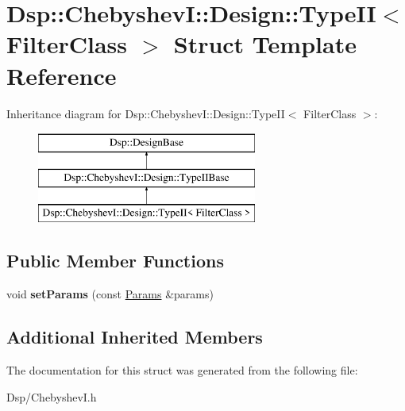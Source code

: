 \hypertarget{structDsp_1_1ChebyshevI_1_1Design_1_1TypeII}{\section{Dsp\-:\-:Chebyshev\-I\-:\-:Design\-:\-:Type\-I\-I$<$ Filter\-Class $>$ Struct Template Reference}
\label{structDsp_1_1ChebyshevI_1_1Design_1_1TypeII}
}
Inheritance diagram for Dsp\-:\-:Chebyshev\-I\-:\-:Design\-:\-:Type\-I\-I$<$ Filter\-Class $>$\-:\begin{figure}[H]
\begin{center}
\leavevmode
\includegraphics[height=3.000000cm]{structDsp_1_1ChebyshevI_1_1Design_1_1TypeII}
\end{center}
\end{figure}
\subsection*{Public Member Functions}
\begin{DoxyCompactItemize}
\item 
\hypertarget{structDsp_1_1ChebyshevI_1_1Design_1_1TypeII_acf75b338d501f75ad675232537eddf24}{void {\bfseries set\-Params} (const \hyperlink{structDsp_1_1Params}{Params} \&params)}\label{structDsp_1_1ChebyshevI_1_1Design_1_1TypeII_acf75b338d501f75ad675232537eddf24}

\end{DoxyCompactItemize}
\subsection*{Additional Inherited Members}


The documentation for this struct was generated from the following file\-:\begin{DoxyCompactItemize}
\item 
Dsp/Chebyshev\-I.\-h\end{DoxyCompactItemize}

